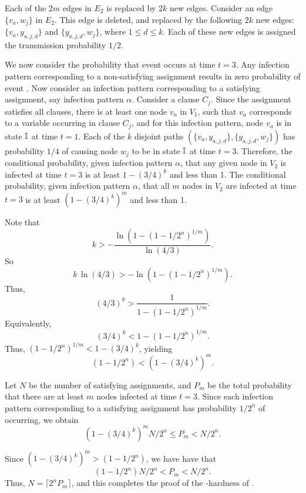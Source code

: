 Each of the $2m$ edges in $E_2$ is replaced by $2k$ new edges.
Consider an edge $\{v_a, w_j\}$ in $E_2$.
This edge is deleted, and replaced by the following $2k$ new edges:
$\{v_a,  y_{a, j,d}\}$ and $\{y_{a, j,d},  w_j\}$, 
where $1 \leq d \leq k$.
Each of these new edges is assigned the transmission probability $1/2$.

We now consider the probability that event \cale{} occurs at time $t = 3$.
Any infection pattern corresponding to a non-satisfying assignment
results in zero probability of event \cale{}.
Now consider an infection pattern corresponding to a satisfying assignment, 
say infection pattern $\alpha$.
Consider a clause $C_j$.
Since the assignment satisfies all clauses,
there is at least one node $v_a$ in $V_1$,
such that $v_a$ corresponds to a variable occurring in clause $C_j$,
and for this infection pattern,
node $v_a$ is in state $\mbox{$\mathbb{I}$}$ at time $t = 1$.
Each of the $k$ disjoint paths 
$( \{v_a,  y_{a, j,d}\}, \{y_{a, j,d},  w_j\} )$
has probability $1/4$ of causing node $w_j$ to be 
in state $\mbox{$\mathbb{I}$}$ at time $t = 3$.
Therefore, the conditional probability, given infection pattern $\alpha$,
that any given node in $V_2$ is infected at time $t = 3$ 
is at least $1 - (3/4)^k$ and less than 1.
The conditional probability, given infection pattern $\alpha$,
that all $m$ nodes in $V_2$ are infected at time $t = 3$ 
is at least $(1 - (3/4)^k)^m$ and less than 1.

\medskip
Note that 
$$k > - \frac{\ln (1- (1-1/2^n)^{1/m} )}{\ln(4/3)}.$$ 
So 
$$k \, \ln(4/3) > -  \ln (1- (1-1/2^n)^{1/m} ).$$
Thus, $$(4/3)^k > \frac{1}{1- (1-1/2^n)^{1/m}}.$$
Equivalently,
$$(3/4)^k < 1- (1-1/2^n)^{1/m}.$$
Thus, $(1-1/2^n)^{1/m} < 1 - (3/4)^k$, yielding
$$(1-1/2^n) < (1 - (3/4)^k)^m.$$

Let $N$ be the number of satisfying assignments, and $P_m$ be the
total probability that there are at least $m$ nodes infected at
time $t = 3$.  Since each infection pattern corresponding to a
satisfying assignment has probability $1/2^n$ of occurring, we
obtain $$(1 - (3/4)^k)^m N/2^n \leq P_m < N/2^n.$$

Since  $(1 - (3/4)^k)^m > ( 1 - 1/2^n)$, we have have that
$$( 1 - 1/2^n) N/2^n < P_m < N/2^n.$$
Thus, 
$N = \displaystyle{\lceil 2^n P_m \rceil}$,
and this completes the proof of the \cnump-hardness of \ThrNewInfv{}.

